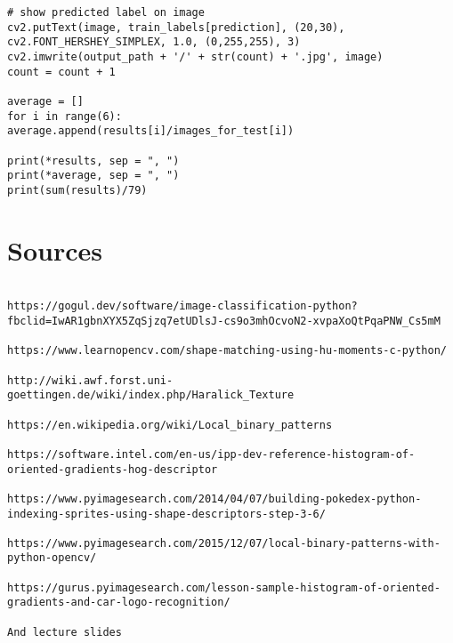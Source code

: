 \documentclass{article}
\begin{document}
\begin{verbatim}
# show predicted label on image
cv2.putText(image, train_labels[prediction], (20,30), cv2.FONT_HERSHEY_SIMPLEX, 1.0, (0,255,255), 3)
cv2.imwrite(output_path + '/' + str(count) + '.jpg', image)
count = count + 1

average = []
for i in range(6):
average.append(results[i]/images_for_test[i])

print(*results, sep = ", ")
print(*average, sep = ", ")
print(sum(results)/79)

\end{verbatim}

\section{Sources}

\begin{verbatim}

https://gogul.dev/software/image-classification-python?fbclid=IwAR1gbnXYX5ZqSjzq7etUDlsJ-cs9o3mhOcvoN2-xvpaXoQtPqaPNW_Cs5mM

https://www.learnopencv.com/shape-matching-using-hu-moments-c-python/

http://wiki.awf.forst.uni-goettingen.de/wiki/index.php/Haralick_Texture

https://en.wikipedia.org/wiki/Local_binary_patterns

https://software.intel.com/en-us/ipp-dev-reference-histogram-of-oriented-gradients-hog-descriptor

https://www.pyimagesearch.com/2014/04/07/building-pokedex-python-indexing-sprites-using-shape-descriptors-step-3-6/

https://www.pyimagesearch.com/2015/12/07/local-binary-patterns-with-python-opencv/

https://gurus.pyimagesearch.com/lesson-sample-histogram-of-oriented-gradients-and-car-logo-recognition/

And lecture slides

\end{verbatim}
	
	
\end{document}

